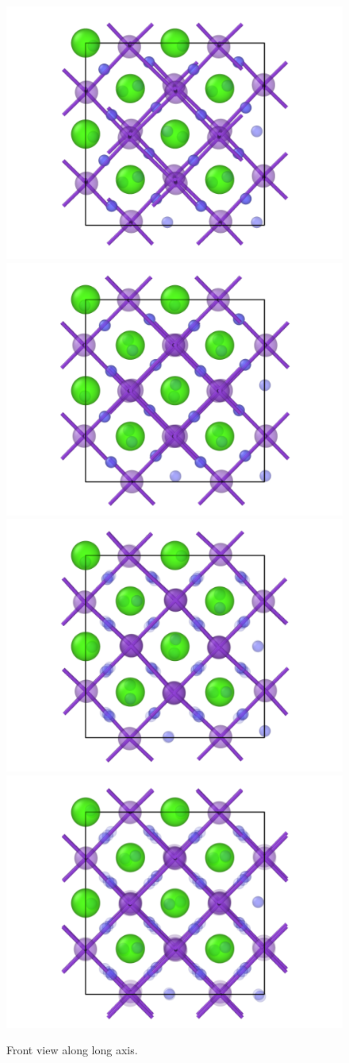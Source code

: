 \documentclass[nobib,a4paper,twoside,notoc,justified,marginals=justified]{tufte-book}
\begin{document}
\begin{figure}
	\includegraphics[width=.5\textwidth]{./plots/defects/062.05.KCaF3/plots/ref_front.png} \hfill
	\includegraphics[width=.5\textwidth]{./plots/defects/062.05.KCaF3/plots/2_front.png} \\
	\includegraphics[width=.5\textwidth]{./plots/defects/062.05.KCaF3/plots/4_front.png} \hfill
	\includegraphics[width=.5\textwidth]{./plots/defects/062.05.KCaF3/plots/5_front.png}
	\caption{Front view along long axis.}
	\label{}
\end{figure}
\end{document}
